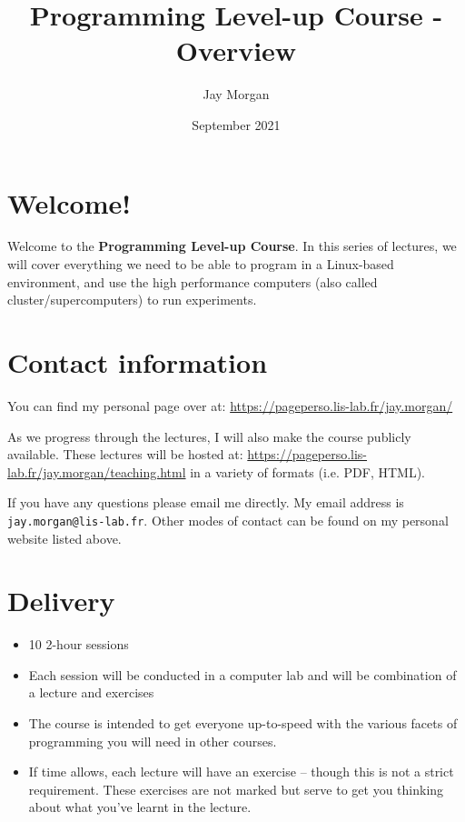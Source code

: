\documentclass[11pt]{article}
\author{Jay Morgan}
\date{September 2021}
\title{Programming Level-up Course - Overview}
\begin{document}
\maketitle
\tableofcontents


\section{Welcome!}
\label{sec:org0c189a5}

Welcome to the \textbf{Programming Level-up Course}. In this series of lectures, we will cover
everything we need to be able to program in a Linux-based environment, and use the
high performance computers (also called cluster/supercomputers) to run experiments. 

\section{Contact information}
\label{sec:orgfe93384}

You can find my personal page over at: \url{https://pageperso.lis-lab.fr/jay.morgan/}

As we progress through the lectures, I will also make the course publicly available. These lectures will be hosted at:
\url{https://pageperso.lis-lab.fr/jay.morgan/teaching.html} in a variety of formats
(i.e. PDF, HTML).

If you have any questions please email me directly. My email address is
\texttt{jay.morgan@lis-lab.fr}. Other modes of contact can be found on my personal website
listed above.

\section{Delivery}
\label{sec:orgf05bca2}
\begin{itemize}
\item 10 2-hour sessions
\item Each session will be conducted in a computer lab and will be combination of a
lecture and exercises
\item The course is intended to get everyone up-to-speed with the various facets of
programming you will need in other courses.
\item If time allows, each lecture will have an exercise -- though this is not a strict
requirement. These exercises are not marked but serve to get you thinking about
what you've learnt in the lecture.
\end{itemize}
\end{document}
